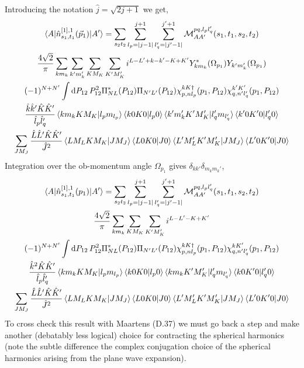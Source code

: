 \documentclass[10pt]{article}
\begin{document}
Introducing the notation $\hat{j} = \sqrt{2 j + 1}$ we get,
\begin{multline*}
\braket{ A | \hat{n}_{s_1,t_1}^{[1],1}(\vec{p}_1) | A'} = \sum_{s_2 t_2}  \sum_{l_p = |j-1|}^{j+1} \sum_{l_q' = |j' - 1|}^{j'+1} \mathcal{M}_{AA'}^{p q,l_p l_q'}(s_1,t_1,s_2,t_2) \\
 \frac{ 4 \sqrt{2}}{\pi} \sum_{k m_k} \sum_{k' m_k'} \sum_{K M_K} \sum_{K' M_K'} i^{L-L'+k-k'-K+K'} Y_{k m_k}^{*}(\Omega_{p_1}) Y_{k' m_k'}(\Omega_{p_1}) \\
 (-1)^{N+N'} \int \text{d} P_{12} \, P_{12}^{2} \Pi^{*}_{N L}(P_{12}) \Pi_{N' L'}(P_{12}) \chi_{p,nl_p}^{kK\dagger}(p_1,P_{12}) \chi_{q,n'l_q'}^{k'K'}(p_1,P_{12}) \\
     \frac{ \hat{k} \hat{k}' \hat{K} \hat{K}' }{ \hat{l}_p \hat{l}_{q}'} \braket{ k m_k K M_K | l_p m_{l_p}} \braket{ k 0 K 0 | l_p 0} \braket{ k' m_k' K' M_K' | l_q' m_{l_q'}} \braket{ k' 0 K' 0 | l_q' 0} \\
    \sum_{J M_J} \frac{ \hat{L} \hat{L}' \hat{K} \hat{K}' }{\hat{J}^{2}} \braket{ L M_L K M_K | J M_J} \braket{ L 0 K 0 | J 0 } \braket{L' M_L' K' M_K' | J M_J } \braket{ L' 0 K' 0 | J 0 } \\ 
\end{multline*}
Integration over the ob-momentum angle $\Omega_{p_1}$ gives $ \delta_{k k'} \delta_{m_k m_k'}$,
\begin{multline*}
\braket{ A | \hat{n}_{s_1,t_1}^{[1],1}(p_1) | A'} = \sum_{s_2 t_2}  \sum_{l_p = |j-1|}^{j+1} \sum_{l_q' = |j' - 1|}^{j'+1} \mathcal{M}_{AA'}^{p q,l_p l_q'}(s_1,t_1,s_2,t_2) \\
 \frac{ 4 \sqrt{2}}{\pi} \sum_{k m_k} \sum_{K M_K} \sum_{K' M_K'} i^{L-L'-K+K'} \\
 (-1)^{N+N'} \int \text{d} P_{12} \, P_{12}^{2} \Pi^{*}_{N L}(P_{12}) \Pi_{N' L'}(P_{12}) \chi_{p,nl_p}^{kK\dagger}(p_1,P_{12}) \chi_{q,n'l_q'}^{k K'}(p_1,P_{12}) \\
     \frac{ \hat{k}^{2} \hat{K} \hat{K}' }{ \hat{l}_p \hat{l}_{q}'} \braket{ k m_k K M_K | l_p m_{l_p}} \braket{ k 0 K 0 | l_p 0} \braket{ k m_k K' M_K' | l_q' m_{l_q'}} \braket{ k 0 K' 0 | l_q' 0} \\
    \sum_{J M_J} \frac{ \hat{L} \hat{L}' \hat{K} \hat{K}' }{\hat{J}^{2}} \braket{ L M_L K M_K | J M_J} \braket{ L 0 K 0 | J 0 } \braket{L' M_L' K' M_K' | J M_J } \braket{ L' 0 K' 0 | J 0 }
    \label{eq:ob_mat_el}
\end{multline*}
To cross check this result with Maartens (D.37) we must go back a step and make another (debatably less logical) choice for contracting the spherical harmonics (note the subtle difference the complex conjugation choice of the spherical harmonics arising from the plane wave expansion).
\end{document}
